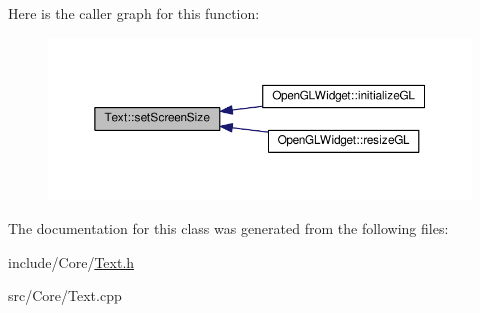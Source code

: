 Here is the caller graph for this function\-:
\nopagebreak
\begin{figure}[H]
\begin{center}
\leavevmode
\includegraphics[width=350pt]{class_text_adf20a23bc781824e83dc50c121f56aea_icgraph}
\end{center}
\end{figure}




The documentation for this class was generated from the following files\-:\begin{DoxyCompactItemize}
\item 
include/\-Core/\hyperlink{_text_8h}{Text.\-h}\item 
src/\-Core/Text.\-cpp\end{DoxyCompactItemize}
